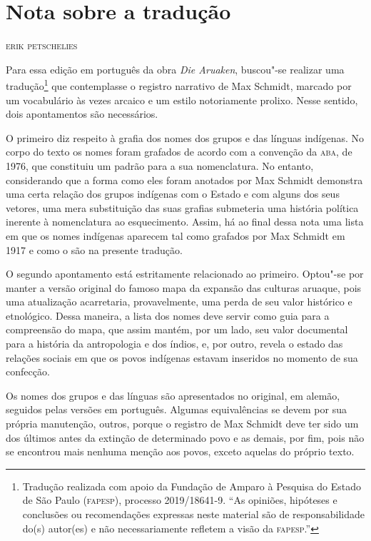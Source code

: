 \chapter*{Nota sobre a tradução}

\begin{flushright}
\textsc{erik petschelies}
\end{flushright}

Para essa edição em português da obra \emph{Die Aruaken}, buscou"-se
realizar uma tradução\footnote{Tradução realizada com apoio da Fundação de Amparo à Pesquisa do Estado de São Paulo (\textsc{fapesp}), processo 2019/18641-9. ``As opiniões, hipóteses e conclusões ou recomendações expressas neste material são de responsabilidade do(s) autor(es) e não necessariamente refletem a visão da \textsc{fapesp}.''} que contemplasse o registro narrativo de Max
Schmidt, marcado por um vocabulário às vezes arcaico e um estilo
notoriamente prolixo. Nesse sentido, dois apontamentos são necessários.

O primeiro diz respeito à grafia dos nomes dos grupos e das línguas
indígenas. No corpo do texto os nomes foram grafados de acordo com a
convenção da \textsc{aba}, de 1976, que constituiu um padrão para a sua
nomenclatura. No entanto, considerando que a forma como eles foram
anotados por Max Schmidt demonstra uma certa relação dos grupos
indígenas com o Estado e com alguns dos seus vetores, uma mera
substituição das suas grafias submeteria uma história política inerente
à nomenclatura ao esquecimento. Assim, há ao final dessa nota uma lista
em que os nomes indígenas aparecem tal como grafados por Max Schmidt em
1917 e como o são na presente tradução.

O segundo apontamento está estritamente relacionado ao primeiro.
Optou"-se por manter a versão original do famoso mapa da expansão das
culturas aruaque, pois uma atualização acarretaria, provavelmente, uma
perda de seu valor histórico e etnológico. Dessa maneira, a lista dos
nomes deve servir como guia para a compreensão do mapa, que assim
mantém, por um lado, seu valor documental para a história da
antropologia e dos índios, e, por outro, revela o estado das relações
sociais em que os povos indígenas estavam inseridos no momento de sua
confecção.

Os nomes dos grupos e das línguas são apresentados no original, em
alemão, seguidos pelas versões em português. Algumas equivalências se
devem por sua própria manutenção, outros, porque o registro de Max
Schmidt deve ter sido um dos últimos antes da extinção de determinado
povo e as demais, por fim, pois não se encontrou mais nenhuma menção aos
povos, exceto aquelas do próprio texto.

